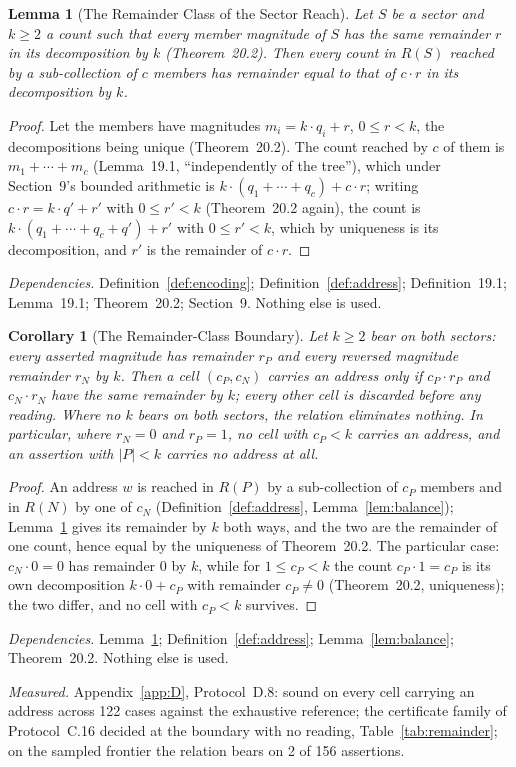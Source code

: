 \documentclass[pdflatex,sn-mathphys-num]{sn-jnl}
\theoremstyle{thmstyleone}%
\newtheorem{lemma}[theorem]{Lemma}
\newtheorem{corollary}[theorem]{Corollary}
\theoremstyle{thmstyletwo}%
\theoremstyle{thmstylethree}%
\newtheorem{lemma}[theorem]{Lemma}
\newtheorem{corollary}[theorem]{Corollary}
\newcommand{\q}[1]{``#1''}        %
\newcommand{\deps}[1]{\par\begin{sloppypar}\noindent\emph{Dependencies.} #1 Nothing else is used.\end{sloppypar}}
\newcommand{\measured}[1]{\par\begin{sloppypar}\noindent\emph{Measured.} #1\end{sloppypar}}
\begin{document}
\begin{lemma}[The Remainder Class of the Sector Reach]\label{lem:remainder}
Let $S$ be a sector and $k\ge2$ a count such that every member magnitude of $S$ has the same remainder $r$ in its decomposition by $k$ (Theorem~20.2). Then every count in $R(S)$ reached by a sub-collection of $c$ members has remainder equal to that of $c\cdot r$ in its decomposition by $k$.
\end{lemma}
\begin{proof}
Let the members have magnitudes $m_i=k\cdot q_i+r$, $0\le r<k$, the decompositions being unique (Theorem~20.2). The count reached by $c$ of them is $m_1+\cdots+m_c$ (Lemma~19.1, \q{independently of the tree}), which under Section~9's bounded arithmetic is $k\cdot(q_1+\cdots+q_c)+c\cdot r$; writing $c\cdot r=k\cdot q'+r'$ with $0\le r'<k$ (Theorem~20.2 again), the count is $k\cdot(q_1+\cdots+q_c+q')+r'$ with $0\le r'<k$, which by uniqueness is its decomposition, and $r'$ is the remainder of $c\cdot r$.
\end{proof}
\deps{Definition~\ref{def:encoding}; Definition~\ref{def:address}; Definition~19.1; Lemma~19.1; Theorem~20.2; Section~9.}

\begin{corollary}[The Remainder-Class Boundary]\label{cor:remainder}
Let $k\ge2$ bear on both sectors: every asserted magnitude has remainder $r_P$ and every reversed magnitude remainder $r_N$ by $k$. Then a cell $(c_P,c_N)$ carries an address only if $c_P\cdot r_P$ and $c_N\cdot r_N$ have the same remainder by $k$; every other cell is discarded before any reading. Where no $k$ bears on both sectors, the relation eliminates nothing. In particular, where $r_N=0$ and $r_P=1$, no cell with $c_P<k$ carries an address, and an assertion with $|P|<k$ carries no address at all.
\end{corollary}
\begin{proof}
An address $w$ is reached in $R(P)$ by a sub-collection of $c_P$ members and in $R(N)$ by one of $c_N$ (Definition~\ref{def:address}, Lemma~\ref{lem:balance}); Lemma~\ref{lem:remainder} gives its remainder by $k$ both ways, and the two are the remainder of one count, hence equal by the uniqueness of Theorem~20.2. The particular case: $c_N\cdot0=0$ has remainder $0$ by $k$, while for $1\le c_P<k$ the count $c_P\cdot1=c_P$ is its own decomposition $k\cdot0+c_P$ with remainder $c_P\ne0$ (Theorem~20.2, uniqueness); the two differ, and no cell with $c_P<k$ survives.
\end{proof}
\deps{Lemma~\ref{lem:remainder}; Definition~\ref{def:address}; Lemma~\ref{lem:balance}; Theorem~20.2.}
\measured{Appendix~\ref{app:D}, Protocol~D.8: sound on every cell carrying an address across 122 cases against the exhaustive reference; the certificate family of Protocol~C.16 decided at the boundary with no reading, Table~\ref{tab:remainder}; on the sampled frontier the relation bears on 2 of 156 assertions.}
\end{document}
